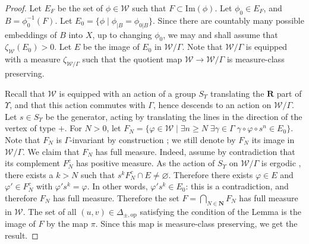 \documentclass[a4paper, 11pt]{article}
\theoremstyle{plain}
\theoremstyle{definition}
\theoremstyle{remark}
\newcommand{\RR}{\mathbf{R}}                          %
\newcommand{\NN}{\mathbf{N}}                          %
\renewcommand{\Im}{\mathrm{Im}}
\newcommand{\scrW}{\mathscr W}
\newcommand{\pmop}{ {\pm,\mathrm{op}}}
\begin{document}
\begin{proof}
Let $E_F$ be the set of $\phi\in\scrW$ such that $F\subset \Im(\phi)$.
Let $\phi_0\in E_F$, and $B=\phi_0^{-1}(F)$. Let $E_{0}=\{\phi\mid \phi_{|B}=\phi_{0|B}\}$. Since there are countably many possible embeddings of $B$ into $X$, up to changing $\phi_0$, we may and shall assume that $\zeta_{\scrW}(E_0)>0$. Let $E$ be the image of $E_{0}$ in $\scrW/\Gamma$. Note that $\scrW/\Gamma$ is equipped with a measure $\zeta_{\scrW/\Gamma}$ such that the quotient map $\scrW\to\scrW/\Gamma$ is measure-class preserving.

Recall that $\scrW$ is equipped with an action of a group $S_\Upsilon$ translating the $\RR$ part of $\Upsilon$, and that this action commutes with $\Gamma$, hence descends to an action on $\scrW/\Gamma$. Let $s\in S_\Upsilon$ be the generator, acting by translating the lines in the direction of the vertex of type $+$. 
For $N>0$, let $F_N=\{\varphi\in\scrW \mid \exists n\geq N\; \exists \gamma\in \Gamma \; \gamma\circ \varphi\circ s^n \in E_0\}$. Note that $F_N$ is $\Gamma$-invariant by construction ; we still denote by $F_N$ its image in $\scrW/\Gamma$. We claim that $F_N$ has full measure. Indeed, assume by contradiction that its complement $F_N^c$ has positive measure.
As the action of $S_\Upsilon$ on $\scrW/\Gamma$ is ergodic \cite[Theorem 7.3]{BCL}, there exists a $k>N$ such that $s^kF_N^c\cap E\neq \varnothing$. Therefore there exists $\varphi\in E$ and $\varphi'\in F_N^c$ with $\varphi' s^k = \varphi$. In other words, $\varphi' s^k \in E_0$: this is a contradiction, and therefore $F_N$ has full measure. Therefore the set $F=\bigcap_{N\in\NN} F_N$ has full measure in $\scrW$. The set of all $(u,v)\in\Delta_\pmop$ satisfying the condition of the Lemma is the image of $F$ by the map $\pi$.
Since this map is measure-class preserving, we get the result.

\end{proof}
\end{document}
